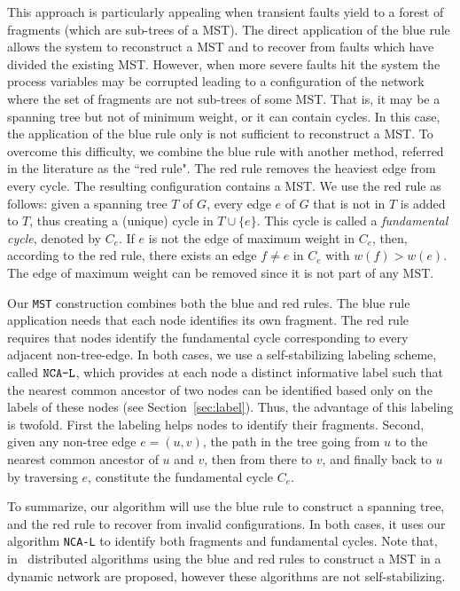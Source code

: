 \documentclass[11pt,a4paper]{article}
\newcommand{\MST}{\mbox{\tt MST}}
\newcommand{\LabA}{\mbox{\tt NCA-L}}
\begin{document}
This approach is particularly appealing 
when transient faults yield to a forest of fragments (which are sub-trees of a MST).
The direct application of the blue rule allows the system to reconstruct a MST and to recover from faults which have divided the existing MST. 
However, when more severe faults hit the system 
the process variables may be corrupted leading to 
a configuration of the network where the 
set of fragments are not sub-trees of some MST. 
That is, it may be a spanning tree but not of minimum weight, 
or it can contain cycles. In this case, 
the application of the blue rule only is not sufficient to reconstruct a MST. 
To overcome this difficulty, we combine the blue rule 
with another method, referred in the literature as the ``red rule".
The red rule removes the heaviest edge from every cycle. 
The resulting configuration contains a MST. 
We use the red rule as follows: given a 
spanning tree $T$ of $G$, every edge $e$ of $G$ that is 
not in $T$ is added to $T$, thus creating a (unique) cycle in $T\cup\{e\}$.
This cycle is called a \textit{fundamental cycle}, denoted by $C_e$. 
If $e$ is not the edge of maximum weight in $C_e$, then, according to the red rule, there exists an edge $f \neq e$ in $C_e$ with $w(f)>w(e)$. 
The edge of maximum weight can be removed since it is not part of any MST. 

Our \MST\/ construction combines both the blue and red rules.
The blue rule application needs that each node identifies its own fragment.
The red rule requires that nodes identify the fundamental cycle corresponding to every adjacent non-tree-edge.
In both cases, we use a self-stabilizing 
labeling scheme, called $\LabA$, which 
provides at each node a distinct informative label such that  
the nearest common ancestor 
of two nodes can be identified based only on the 
labels of these nodes (see Section~\ref{sec:label}). 
Thus, the advantage of this labeling 
is twofold. First the labeling helps nodes to identify their fragments.
Second, given any non-tree edge $e=(u,v)$, the path in 
the tree going from $u$ to the nearest common ancestor of $u$ and $v$, then 
from there to $v$, and finally back to $u$ by traversing 
$e$, constitute the fundamental cycle $C_e$.

To summarize, our algorithm will use the blue rule to construct a spanning tree, and the red rule to recover from invalid configurations. In both cases, it 
uses our algorithm \LabA\/ 
to identify both fragments and fundamental cycles. Note that, in~\cite{ParkMHT90,PMHT92} distributed algorithms using the blue and red rules to construct a MST in a dynamic network are proposed, however these algorithms are not self-stabilizing.
\end{document}
